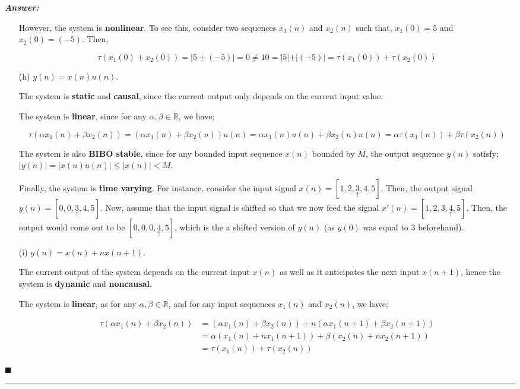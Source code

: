\documentclass[12pt]{article}
\theoremstyle{definition}
\newenvironment{answer}{
    \textbf{\textit{Answer:}} \qquad
}{\hfill $\blacksquare$ \\ \begin{center}
    \rule{0.6\linewidth}{0.5px}    
\end{center}
}
\newcommand{\R}{\mathbb{R}}
\begin{document}
\begin{answer}
\begin{enumerate}
        However, the system is \textbf{nonlinear}. To see this, consider two sequences $x_1(n)$ and $x_2(n)$ such that, $x_1(0) = 5$ and $x_2(0) = (-5)$. Then,

        $$
        \tau(x_1(0) + x_2(0)) = \vert 5 + (-5) \vert = 0 \neq 10 = \vert 5 \vert + \vert (-5) \vert = \tau(x_1(0)) + \tau(x_2(0))
        $$

        \item[(h)] $y(n) = x(n) u(n)$.
        
        The system is \textbf{static} and \textbf{causal}, since the current output only depends on the current input value. 

        The system is \textbf{linear}, since for any $\alpha, \beta \in \R$, we have;

        $$
        \tau(\alpha x_1(n) + \beta x_2(n)) = (\alpha x_1(n) + \beta x_2(n)) u(n) = \alpha x_1(n)u(n) + \beta x_2(n)u(n) = \alpha \tau(x_1(n)) + \beta \tau(x_2(n))
        $$

        The system is also \textbf{BIBO stable}, since for any bounded input sequence $x(n)$ bounded by $M$, the output sequence $y(n)$ satisfy; $\vert y(n) \vert = \vert x(n) u(n) \vert \leq \vert x(n) \vert < M$.

        Finally, the system is \textbf{time varying}. For instance, consider the input signal $x(n) = [1, 2, \underset{\uparrow}{3}, 4, 5]$. Then, the output signal $y(n) = [0, 0, \underset{\uparrow}{3}, 4, 5]$. Now, assume that the input signal is shifted so that we now feed the signal $x'(n) = [1, 2, 3, \underset{\uparrow}{4}, 5]$. Then, the output would come out to be $[0, 0, 0, \underset{\uparrow}{4}, 5]$, which is the a shifted version of $y(n)$ (as $y(0)$ was equal to $3$ beforehand).

        \item[(i)] $y(n) = x(n) + nx(n+1)$.
        
        The current output of the system depends on the current input $x(n)$ as well as it anticipates the next input $x(n+1)$, hence the system is \textbf{dynamic} and \textbf{noncausal}. 

        The system is \textbf{linear}, as for any $\alpha, \beta \in \R$, and for any input sequences $x_1(n)$ and $x_2(n)$, we have;

        \begin{align*}
            \tau(\alpha x_1(n) + \beta x_2(n)) 
            & = (\alpha x_1(n) + \beta x_2(n)) + n (\alpha x_1(n+1) + \beta x_2(n+1))\\
            & = \alpha (x_1(n) + n x_1(n+1)) + \beta (x_2(n) + n x_2(n+1))\\
            & = \tau(x_1(n)) + \tau(x_2(n))      
        \end{align*}


\end{enumerate}
\end{answer}
\end{document}
